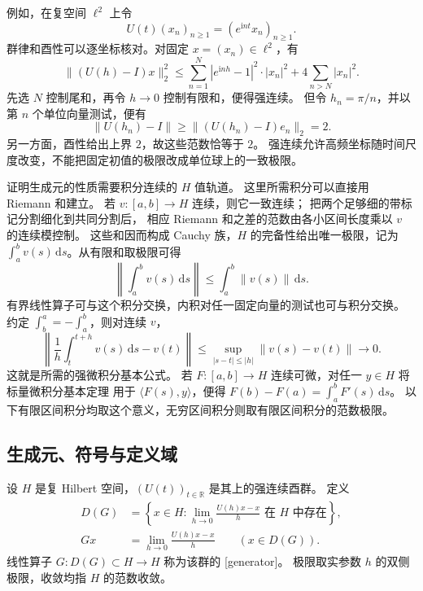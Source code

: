 \ProseParagraphBreak

例如，在复空间 \(\ell^2\) 上令
\[
 U(t)(x_n)_{n\geq1}=(e^{\mathrm i n t}x_n)_{n\geq1}.
\]
群律和酉性可以逐坐标核对。对固定 \(x=(x_n)\in\ell^2\)，有
\[
 \|(U(h)-I)x\|_2^2
 \leq\sum_{n=1}^N|e^{\mathrm i n h}-1|^2\cdot|x_n|^2
       +4\sum_{n>N}|x_n|^2.
\]
先选 \(N\) 控制尾和，再令 \(h\to0\) 控制有限和，便得强连续。
但令 \(h_n=\pi/n\)，并以第 \(n\) 个单位向量测试，便有
\[
 \|U(h_n)-I\|\geq\|(U(h_n)-I)e_n\|_2=2.
\]
另一方面，酉性给出上界 \(2\)，故这些范数恰等于 \(2\)。
强连续允许高频坐标随时间尺度改变，不能把固定初值的极限改成单位球上的一致极限。

\ProseParagraphBreak

证明生成元的性质需要积分连续的 \(H\) 值轨道。
这里所需积分可以直接用 Riemann 和建立。
若 \(v:[a,b]\to H\) 连续，则它一致连续；
把两个足够细的带标记分割细化到共同分割后，
相应 Riemann 和之差的范数由各小区间长度乘以 \(v\) 的连续模控制。
这些和因而构成 Cauchy 族，\(H\) 的完备性给出唯一极限，记为
\(\int_a^b v(s)\,\mathrm ds\)。从有限和取极限可得
\begin{equation}\label{b1:eq:29-vector-integral-bound}
 \left\|\int_a^b v(s)\,\mathrm ds\right\|
 \leq\int_a^b\|v(s)\|\,\mathrm ds.
\end{equation}
有界线性算子可与这个积分交换，内积对任一固定向量的测试也可与积分交换。
约定 \(\int_b^a=-\int_a^b\)，则对连续 \(v\)，
\[
 \left\|\frac1h\int_t^{t+h}v(s)\,\mathrm ds-v(t)\right\|
 \leq\sup_{|s-t|\leq|h|}\|v(s)-v(t)\|\longrightarrow0.
\]
这就是所需的强微积分基本公式。
若 \(F:[a,b]\to H\) 连续可微，对任一 \(y\in H\) 将标量微积分基本定理
用于 \(\langle F(s),y\rangle\)，便得
\(F(b)-F(a)=\int_a^bF'(s)\,\mathrm ds\)。
以下有限区间积分均取这个意义，无穷区间积分则取有限区间积分的范数极限。

\subsection{生成元、符号与定义域}
\label{b1:subsec:290802}

\begin{definition}[酉群的生成元]
\label{b1:def:29-group-generator}
设 \(H\) 是复 Hilbert 空间，\((U(t))_{t\in\mathbb R}\) 是其上的强连续酉群。
定义
\begin{equation}\label{b1:eq:29-generator-domain}
 \begin{split}
 D(G)&=\left\{x\in H:
       \lim_{h\to0}\frac{U(h)x-x}{h}\text{ 在 }H\text{ 中存在}\right\},\\
 Gx&=\lim_{h\to0}\frac{U(h)x-x}{h}\qquad(x\in D(G)).
 \end{split}
\end{equation}
线性算子 \(G:D(G)\subset H\to H\) 称为该群的
[generator]。
极限取实参数 \(h\) 的双侧极限，收敛均指 \(H\) 的范数收敛。
\end{definition}

